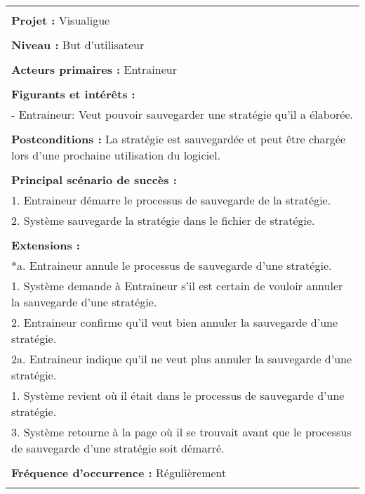 \begin{tabular}{|p{16cm}|}
	\hline
	\\
	\textbf{Projet :} Visualigue\\
	\\
	\textbf{Niveau :} But d'utilisateur\\
	\\
	\textbf{Acteurs primaires :} Entraineur\\
	\\
	\textbf{Figurants et intérêts :} \\
	- Entraineur: Veut pouvoir sauvegarder une stratégie qu'il a élaborée.\\
	\\
	\textbf{Postconditions :} La stratégie est sauvegardée et peut être chargée lors d'une prochaine utilisation du logiciel.\\
	\\
	\textbf{Principal scénario de succès :}\\
	1. Entraineur démarre le processus de sauvegarde de la stratégie.\\
	2. Système sauvegarde la stratégie dans le fichier de stratégie.\\
	\\
	\textbf{Extensions :}\\
	*a. Entraineur annule le processus de sauvegarde d'une stratégie.\\
	\hspace{1cm}1. Système demande à Entraineur s'il est certain de vouloir annuler la sauvegarde d'une stratégie.\\
	\hspace{1cm}2. Entraineur confirme qu'il veut bien annuler la sauvegarde d'une stratégie.\\
	\hspace{2cm}2a. Entraineur indique qu'il ne veut plus annuler la sauvegarde d'une stratégie.\\
	\hspace{3cm}1. Système revient où il était dans le processus de sauvegarde d'une stratégie.\\
	\hspace{1cm}3. Système retourne à la page où il se trouvait avant que le processus de sauvegarde d'une stratégie soit démarré.\\
	\\
	\textbf{Fréquence d'occurrence :} Régulièrement\\
	\\
	\hline
\end{tabular}
